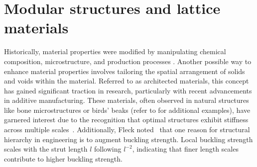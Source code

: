 \section{Modular structures and lattice materials}
Historically, material properties were modified by manipulating chemical composition, microstructure, and production processes . Another possible way to enhance material properties involves tailoring the spatial arrangement of solids and voids within the material. Referred to as architected materials, this concept has gained significant traction in research, particularly with recent advancements in additive manufacturing. These materials, often observed in natural structures like bone microstructures or birds' beaks (refer to  for additional examples), have garnered interest due to the recognition that optimal structures exhibit stiffness across multiple scales~. Additionally, Fleck noted~ that one reason for structural hierarchy in engineering is to augment buckling strength. Local buckling strength scales with the strut length $l$ following $l^{-2}$, indicating that finer length scales contribute to higher buckling strength.

